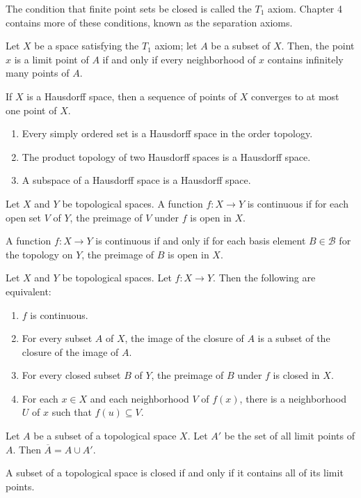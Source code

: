 \documentclass{article}
\newcommand{\B}{\mathcal B}
\begin{document}
\medskip{}

    The condition that finite point sets be closed is called the $T_1$ axiom. Chapter 4 contains more of these conditions, known as the separation axioms.

\medskip{}

    Let $X$ be a space satisfying the $T_1$ axiom; let $A$ be a subset of $X$. Then, the point $x$ is a limit point of $A$ if and only if every neighborhood of $x$ contains infinitely many points of $A$.

\medskip{}

    If $X$ is a Hausdorff space, then a sequence of points of $X$ converges to at most one point of $X$.

\medskip{}
    \begin{enumerate}
    \item Every simply ordered set is a Hausdorff space in the order topology.
    \item The product topology of two Hausdorff spaces is a Hausdorff space.
    \item A subspace of a Hausdorff space is a Hausdorff space.
    \end{enumerate}

\medskip{}

    Let $X$ and $Y$ be topological spaces. A function $f: X \to Y$ is continuous if for each open set $V$ of $Y$, the preimage of $V$ under $f$ is open in $X$.

\medskip{}

    A function $f: X \to Y$ is continuous if and only if for each basis element $B \in \B$ for the topology on $Y$, the preimage of $B$ is open in $X$.

\medskip{}

    Let $X$ and $Y$ be topological spaces. Let $f: X \to Y$. Then the following are equivalent:
    \begin{enumerate}
        \item $f$ is continuous.
        \item For every subset $A$ of $X$, the image of the closure of $A$ is a subset of the closure of the image of $A$.
        \item For every closed subset $B$ of $Y$, the preimage of $B$ under $f$ is closed in $X$.
        \item For each $x \in X$ and each neighborhood $V$ of $f(x)$, there is a neighborhood $U$ of $x$ such that $f(u) \subseteq V$.
    \end{enumerate}

\medskip{}

    Let $A$ be a subset of a topological space $X$.
    Let $A'$ be the set of all limit points of $A$.
    Then $\overline A = A \cup A'$.

\medskip{}

    A subset of a topological space is closed if and only if it contains all of its limit points.
\end{document}
